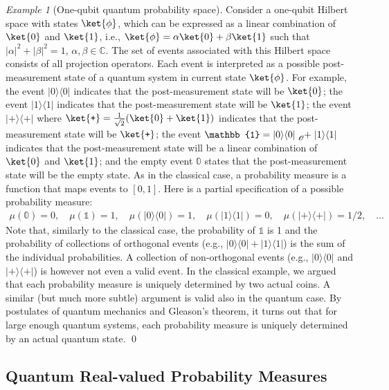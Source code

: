 \documentclass{article}
\theoremstyle{remark}
\newtheorem{example}{Example}
\newcommand{\proj}[1]{|#1 \rangle\langle #1 |}
\newcommand{\ps}{\texttt{+}}
\def\C{{\mathbb{C}}}
\begin{document}
\begin{example}[One-qubit quantum probability space] Consider
a one-qubit Hilbert space with states $\ket{\phi}$, which can be
expressed as a linear combination of $\ket{0}$ and $\ket{1}$, i.e.,
$\ket{\phi}=\alpha\ket{0}+\beta\ket{1}$ such that $|\alpha|^{2}+|\beta|^{2}=1$,
$\alpha,\beta\in\C$. The set of events associated with this Hilbert
space consists of all projection operators. Each event is interpreted
as a possible post-measurement state of a quantum system in current
state $\ket{\phi}$. For example, the event $\proj{0}$ indicates
that the post-measurement state will be $\ket{0}$; the event $\proj{1}$
indicates that the post-measurement state will be $\ket{1}$; the
event $\proj{\ps}$ where $\ket{\ps}=\frac{1}{\sqrt{2}}(\ket{0}+\ket{1})$
indicates that the post-measurement state will be $\ket{\ps}$; the
event $\mathbb{1}=\proj{0}\tensor*[_{\mathscr{O}}]{+}{}\proj{1}$
indicates that the post-measurement state will be a linear combination
of $\ket{0}$ and $\ket{1}$; and the empty event $\mathbb{0}$ states
that the post-measurement state will be the empty state. As in the
classical case, a probability measure is a function that maps events
to $[0,1]$. Here is a partial specification of a possible probability
measure: 
\[
\begin{array}{rcl}
\mu\left(\mathbb{0}\right)=0,\quad\mu\left(\mathbb{1}\right)=1,\quad\mu\left(\proj{0}\right)=1,\quad\mu\left(\proj{1}\right)=0,\quad\mu\left(\proj{\ps}\right)=1/2,\quad\ldots\end{array}
\]
Note that, similarly to the classical case, the probability of $\mathbb{1}$
is 1 and the probability of collections of orthogonal events (e.g.,
$\proj{0}+\proj{1}$) is the sum of the individual probabilities.
A collection of non-orthogonal events (e.g., $\proj{0}$ and $\proj{\ps}$)
is however not even a valid event. In the classical example, we argued
that each probability measure is uniquely determined by two actual
coins. A similar (but much more subtle) argument is valid also in
the quantum case. By postulates of quantum mechanics and Gleason's
theorem, it turns out that for large enough quantum systems, each
probability measure is uniquely determined by an actual quantum state.
\qed\end{example}



\subsection{Quantum Real-valued Probability Measures}
\end{document}
